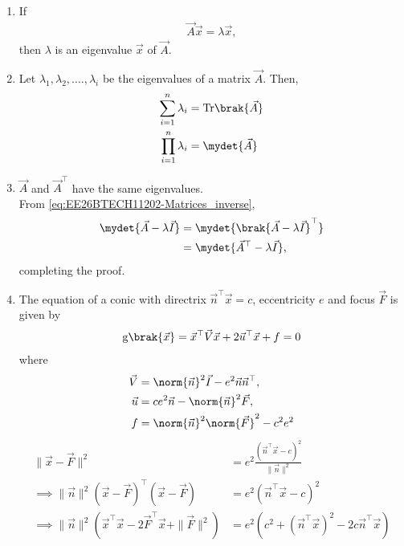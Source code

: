 \begin{enumerate}[label=\thesubsection.\arabic*, ref=\thesubsection.\theenumi]
\begin{align}
\end{align}
\item If
\begin{align}
\vec{A}
\vec{x}
=\lambda\vec{x},
\label{eq:EE26BTECH11202-eig-def}
\end{align}
then 
	$\lambda$ is an eigenvalue 
$\vec{x}$
of 
$\vec{A}$.
\item Let $\lambda_1, \lambda_2, .... , \lambda_i$ be the eigenvalues of a matrix $\vec{A}$. Then, 
\begin{align}
	\sum_{i=1}^{n} \lambda_i &= \text{Tr}\brak{\vec{A}} \label{eq:EE26BTECH11202-Matrices_2}
	\\
	\prod_{i=1}^{n} \lambda_i &= \mydet{\vec{A}} \label{eq:EE26BTECH11202-Matrices_3}
\end{align}
\item $\vec{A}$ and $\vec{A}^{\top}$ have the same eigenvalues.
	\\
	\solution From  \eqref{eq:EE26BTECH11202-Matrices_inverse},
\begin{align}
\mydet{\vec{A} - \lambda \vec{I}}
&=
\mydet{\brak{\vec{A} - \lambda \vec{I}}^{\top}}
\\
&=
\mydet{\vec{A}^{\top} - \lambda \vec{I}},
\end{align}
completing the proof.
\item
The equation of  a conic with directrix $\vec{n}^{\top}\vec{x} = c$, eccentricity $e$ and focus $\vec{F}$ is given by 
\begin{align}
    \label{eq:EE26BTECH11202-app-conic_quad_form}
	\text{g}\brak{\vec{x}} = \vec{x}^{\top}\vec{V}\vec{x}+2\vec{u}^{\top}\vec{x}+f=0
    \end{align}
where     
\begin{align}
  \label{eq:EE26BTECH11202-app-conic_quad_form_v}
\vec{V} &=\norm{\vec{n}}^2\vec{I}-e^2\vec{n}\vec{n}^{\top}, 
\\
\label{eq:EE26BTECH11202-app-conic_quad_form_u}
\vec{u} &= ce^2\vec{n}-\norm{\vec{n}}^2\vec{F}, 
\\
\label{eq:EE26BTECH11202-app-conic_quad_form_f}
f &= \norm{\vec{n}}^2\norm{\vec{F}}^2-c^2e^2
    \end{align}
\solution
\begin{align}
\|\vec{x} - \vec{F}\|^2 &= e^2 \frac{(\vec{n}^\top \vec{x} - c)^2}{\|\vec{n}\|^2} 
\\
\implies \|\vec{n}\|^2 (\vec{x} - \vec{F})^\top (\vec{x} - \vec{F}) &= e^2 \left(\vec{n}^\top \vec{x} - c\right)^2 
\\
\implies \|\vec{n}\|^2 \left(\vec{x}^\top \vec{x} - 2\vec{F}^\top \vec{x} + \|\vec{F}\|^2\right) &= e^2 \left(c^2 + \left(\vec{n}^\top \vec{x}\right)^2 - 2c\vec{n}^\top \vec{x}\right) 

\end{align}
\end{enumerate}
